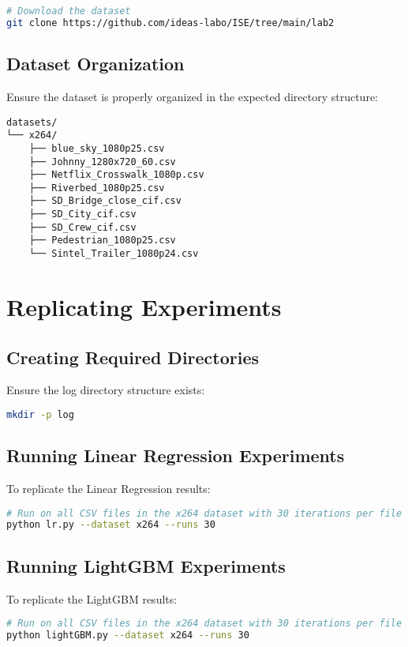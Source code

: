 \documentclass[10pt]{article}
\begin{document}
\begin{lstlisting}[language=bash]
# Download the dataset
git clone https://github.com/ideas-labo/ISE/tree/main/lab2
\end{lstlisting}

\subsection{Dataset Organization}
Ensure the dataset is properly organized in the expected directory structure:

\begin{lstlisting}
datasets/
└── x264/
    ├── blue_sky_1080p25.csv
    ├── Johnny_1280x720_60.csv
    ├── Netflix_Crosswalk_1080p.csv
    ├── Riverbed_1080p25.csv
    ├── SD_Bridge_close_cif.csv
    ├── SD_City_cif.csv
    ├── SD_Crew_cif.csv
    ├── Pedestrian_1080p25.csv
    └── Sintel_Trailer_1080p24.csv
\end{lstlisting}

\section{Replicating Experiments}

\subsection{Creating Required Directories}
Ensure the log directory structure exists:

\begin{lstlisting}[language=bash]
mkdir -p log
\end{lstlisting}

\subsection{Running Linear Regression Experiments}
To replicate the Linear Regression results:

\begin{lstlisting}[language=bash]
# Run on all CSV files in the x264 dataset with 30 iterations per file
python lr.py --dataset x264 --runs 30
\end{lstlisting}

\subsection{Running LightGBM Experiments}
To replicate the LightGBM results:

\begin{lstlisting}[language=bash]
# Run on all CSV files in the x264 dataset with 30 iterations per file
python lightGBM.py --dataset x264 --runs 30
\end{lstlisting}
\end{document}
